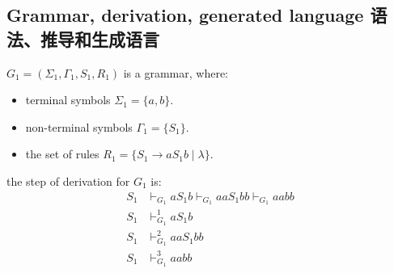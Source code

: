 \documentclass[a4paper,11pt,utf8]{article}
\newcommand{\lineindent}{\hspace*{\parindent}}
\begin{document}
\subsection{Grammar, derivation, generated language 语法、推导和生成语言}
\begin{tcolorbox}[title=example 1,colback=white,colframe=black,width=\textwidth,arc=0pt]
    $G_1 = (\Sigma_1, \Gamma_1, S_1, R_1)$ is a grammar, where:
    \begin{itemize}
        \item terminal symbols $\Sigma_1 = \{a,b\}$.
        \item non-terminal symbols $\Gamma_1 = \{S_1\}$.
        \item the set of rules $R_1 = \{S_1 \to a S_1 b \mid \lambda\}$.
    \end{itemize}
    \lineindent the step of derivation for $G_1$ is:
    \[
        \begin{aligned}
            S_1 &\vdash_{G_1} a S_1 b \vdash_{G_1} a a S_1 b b \vdash_{G_1} aabb \\[1ex]
            S_1 &\vdash_{G_1}^1 a S_1 b \\[1ex]
            S_1 &\vdash_{G_1}^2 aa S_1 bb \\[1ex]
            S_1 &\vdash_{G_1}^3 aabb
        \end{aligned}
    \]
\end{tcolorbox}
\begin{tcolorbox}[title=example 2,colback=white,colframe=black,width=\textwidth,arc=0pt]
\end{tcolorbox}




% 
\end{document}
